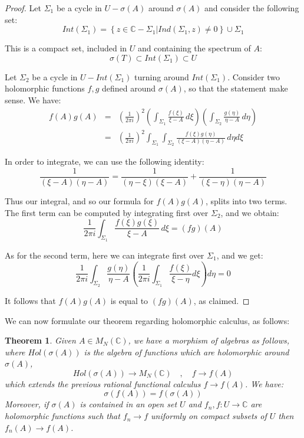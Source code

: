 \documentclass[12pt]{amsbook}
\newtheorem{theorem}{Theorem}[chapter]
\begin{document}
\begin{proof}
Let $\Sigma_1$ be a cycle in $U-\sigma(A)$ around $\sigma(A)$ and consider the following set:
$$Int(\Sigma_1)=\left\{z\in\mathbb C-\Sigma_1\Big|Ind(\Sigma_1,z)\neq 0\right\}\cup\Sigma_1$$

This is a compact set, included in $U$ and containing the spectrum of $A$:
$$\sigma(T)\subset Int(\Sigma_1)\subset U$$

Let $\Sigma_2$ be a cycle in $U-Int(\Sigma_1)$ turning around $Int(\Sigma_1)$. Consider two holomorphic functions $f,g$ defined around $\sigma(A)$, so that the statement make sense. We have:
\begin{eqnarray*}
f(A)g(A)
&=&\left(\frac{1}{2\pi i}\right)^2\left(\int_{\Sigma_1}\frac{f(\xi)}{\xi -A}\,d\xi\right) 
\left(\int_{\Sigma_2}\frac{g(\eta)}{\eta-A}\,d\eta\right)\\
&=&\left(\frac{1}{2\pi i}\right)^2\int_{\Sigma_1}\int_{\Sigma_2}\frac{f(\xi)g(\eta )}{(\xi-A)(\eta-A)}\,d\eta d\xi
\end{eqnarray*}

In order to integrate, we can use the following identity:
$$\frac{1}{(\xi-A)(\eta-A)}=\frac{1}{(\eta-\xi)(\xi-A)}+\frac{1}{(\xi-\eta)(\eta-A)}$$

Thus our integral, and so our formula for $f(A)g(A)$, splits into two terms. The first term can be computed by integrating first over $\Sigma_2$, and we obtain:
$$\frac{1}{2\pi i}\int_{\Sigma_1}\frac{f(\xi)g(\xi)}{\xi-A}\,d\xi =(fg)(A)$$

As for the second term, here we can integrate first over $\Sigma_1$, and we get:
$$\frac{1}{2\pi i}\int_{\Sigma_2}\frac{g(\eta)}{\eta-A}
\left( \frac{1}{2\pi i}\int_{\Sigma_1}\frac{f(\xi )}{\xi -\eta}d\xi\right)d\eta =0$$

It follows that $f(A)g(A)$ is equal to $(fg)(A)$, as claimed.
\end{proof}

We can now formulate our theorem regarding holomorphic calculus, as follows:

\begin{theorem}
Given $A\in M_N(\mathbb C)$, we have a morphism of algebras as follows, where $Hol(\sigma(A))$ is the algebra of functions which are holomorphic around $\sigma(A)$,
$$Hol(\sigma(A))\to M_N(\mathbb C)\quad,\quad f\to f(A)$$
which extends the previous rational functional calculus $f\to f(A)$. We have:
$$\sigma(f(A))=f(\sigma(A))$$
Moreover, if $\sigma(A)$ is contained in an open set $U$ and $f_n,f:U\to\mathbb C$ are holomorphic functions such that $f_n\to f$ uniformly on compact subsets of $U$ then $f_n(A)\to f(A)$.
\end{theorem}
\end{document}
